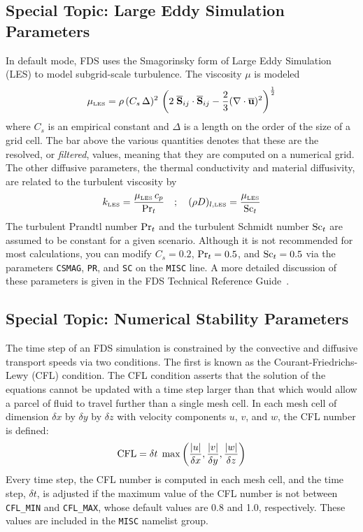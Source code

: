 \documentclass[11pt]{book}
\newcommand{\ct}{\tt\small}
\newcommand{\dx}{\delta x}
\newcommand{\dy}{\delta y}
\newcommand{\dz}{\delta z}
\newcommand{\dt}{\delta t}
\newcommand{\hu}{u}
\newcommand{\hv}{v}
\newcommand{\hw}{w}
\newcommand{\bu}{{\bf u}}
\newcommand{\bS}{{\bf S}}
\newcommand{\ha}{\frac{1}{2}}
\newcommand{\be}{\begin{equation}}
\newcommand{\ee}{\end{equation}}
\newcommand{\PR}{\hbox{Pr}}
\newcommand{\SC}{\hbox{Sc}}
\begin{document}
\subsection{Special Topic: Large Eddy Simulation Parameters}
\label{info:LES} 

In default mode, FDS uses the Smagorinsky form of Large Eddy Simulation (LES) to model subgrid-scale turbulence.
The viscosity $\mu$ is modeled
\be \mu_{\hbox{\tiny LES}} = \rho \, (C_s\, \Delta)^2 \,
   \left(2 \; \overline{\bS}_{ij} \cdot \overline{\bS}_{ij} - \frac{2}{3} (\nabla \cdot \overline{\bu})^2 \right)^\ha \ee
where $C_s$ is an empirical constant and $\Delta$ is a length on the
order of the size of a grid cell.
The bar above the various quantities denotes that these are the resolved, or {\em filtered}, values, meaning
that they are computed on a numerical grid.
The other diffusive parameters,
the thermal conductivity and material diffusivity, are related to the turbulent viscosity by
\be k_{\hbox{\tiny LES}} = \frac{\mu_{\hbox{\tiny LES}} \, c_p}{\PR_t}
\quad ; \quad
 (\rho D)_{l,\hbox{\tiny LES}} =\frac{\mu_{\hbox{\tiny LES}}}{\SC_t} \ee
The turbulent Prandtl number $\PR_t$ and the turbulent Schmidt number $\SC_t$ are assumed to be
constant for a given scenario. Although it is not recommended for most calculations, you can modify
$C_s=0.2$, $\PR_t=0.5$, and $\SC_t=0.5$ via the parameters {\ct CSMAG}, {\ct PR}, and {\ct SC} on the {\ct MISC} line. A more detailed
discussion of these parameters is given in the FDS Technical Reference Guide~\cite{FDS_Tech_Guide_5}.



\subsection{Special Topic: Numerical Stability Parameters}
\label{info:CFL}

The time step of an FDS simulation is constrained by the convective and diffusive
transport speeds via two conditions. The first is known as the
Courant-Friedrichs-Lewy (CFL) condition. The CFL condition asserts that the solution of the equations cannot be updated with a time step
larger than that which would allow a parcel of fluid to travel further than a single mesh cell.
In each mesh cell of dimension $\dx$ by $\dy$ by $\dz$ with velocity
components $u$, $v$, and $w$, the CFL number is defined:
\be \hbox{CFL} = \dt \; \max \left(\frac{|\hu|}{\dx},\frac{|\hv|}{\dy},\frac{|\hw|}{\dz} \right)   \label{cfl}
\ee
Every time step, the CFL number is computed in each mesh cell, and the time step, $\dt$, is adjusted if the
maximum value of the CFL number is not between {\ct CFL\_MIN} and {\ct CFL\_MAX}, whose default values are
0.8 and 1.0, respectively. These values are included in the {\ct MISC} namelist group.
\end{document}
